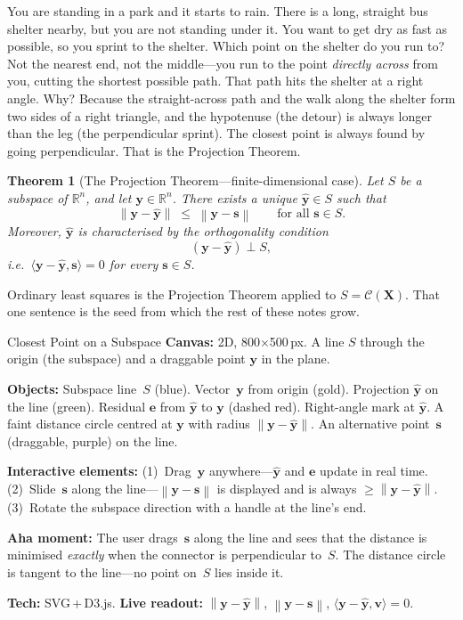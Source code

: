 \documentclass[11pt,a4paper]{article}
\theoremstyle{plain}
\newtheorem{theorem}{Theorem}[section]
\theoremstyle{definition}
\newcommand{\R}{\mathbb{R}}
\newcommand{\yhat}{\hat{\bm{y}}}
\newcommand{\bX}{\bm{X}}
\newcommand{\by}{\bm{y}}
\newcommand{\be}{\bm{e}}
\newcommand{\Col}{\mathcal{C}}
\newcommand{\ip}[2]{\langle #1, #2 \rangle}
\newcommand{\norm}[1]{\left\lVert #1 \right\rVert}
\begin{document}
\begin{toystory}
You are standing in a park and it starts to rain.  There is a long,
straight bus shelter nearby, but you are not standing under it.
You want to get dry as fast as possible, so you sprint to the shelter.
Which point on the shelter do you run to?  Not the nearest end, not
the middle---you run to the point \emph{directly across} from you,
cutting the shortest possible path.  That path hits the shelter at a
right angle.  Why?  Because the straight-across path and the walk
along the shelter form two sides of a right triangle, and the
hypotenuse (the detour) is always longer than the leg (the
perpendicular sprint).  The closest point is always found by going
perpendicular.  That is the Projection Theorem.
\end{toystory}

\begin{theorem}[The Projection Theorem---finite-dimensional case]%
  \label{thm:projection}
Let $S$ be a subspace of $\R^n$, and let $\by\in \R^n$.  There exists
a unique $\yhat\in S$ such that
\[
  \norm{\by - \yhat} \;\le\; \norm{\by - \bm{s}}
  \qquad\text{for all } \bm{s}\in S.
\]
Moreover, $\yhat$ is characterised by the \emph{orthogonality condition}
\[
  (\by - \yhat) \perp S,
\]
i.e.\ $\ip{\by - \yhat}{\bm{s}} = 0$ for every $\bm{s}\in S$.
\end{theorem}

Ordinary least squares is the Projection Theorem applied to
$S = \Col(\bX)$.
That one sentence is the seed from which the rest of these notes grow.

\begin{vizspec}{Closest Point on a Subspace}
\textbf{Canvas:} 2D, 800$\times$500\,px.  A line $S$ through the origin (the subspace) and a draggable point $\by$ in the plane.

\textbf{Objects:} Subspace line~$S$ (\textcolor{colspace}{blue}).
Vector~$\by$ from origin (\textcolor{response}{gold}).
Projection $\yhat$ on the line (\textcolor{projection}{green}).
Residual $\be$ from $\yhat$ to $\by$ (dashed \textcolor{residual}{red}).
Right-angle mark at $\yhat$.
A faint distance circle centred at $\by$ with radius $\norm{\by - \yhat}$.
An alternative point~$\bm{s}$ (draggable, \textcolor{constraint}{purple}) on the line.

\textbf{Interactive elements:}
(1)~Drag~$\by$ anywhere---$\yhat$ and $\be$ update in real time.
(2)~Slide~$\bm{s}$ along the line---$\norm{\by - \bm{s}}$ is displayed and is always $\ge \norm{\by - \yhat}$.
(3)~Rotate the subspace direction with a handle at the line's end.

\textbf{Aha moment:} The user drags~$\bm{s}$ along the line and
sees that the distance is minimised \emph{exactly} when the connector
is perpendicular to~$S$.  The distance circle is tangent to the
line---no point on~$S$ lies inside it.

\textbf{Tech:} SVG\,+\,D3.js.
\quad \textbf{Live readout:} $\norm{\by - \yhat}$, $\norm{\by - \bm{s}}$,
$\ip{\by - \yhat}{\bm{v}} = 0$.
\end{vizspec}
\end{document}
